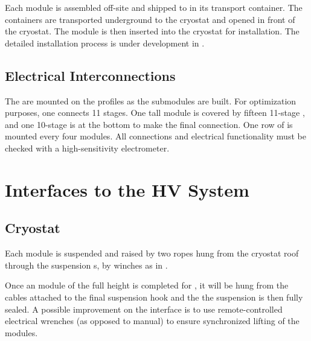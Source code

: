 Each  module is assembled off-site and shipped to \surf in its transport container.   The containers are transported underground to the cryostat and opened in front of the cryostat.  The  module is then inserted into the cryostat for installation. The detailed installation process is under development in .


\subsection{Electrical Interconnections}
\label{sec:fddp-prod-assy-elec-connec}

The  are mounted on the profiles as the submodules are built.  For optimization purposes, one   connects \num{11} stages.   %
One \tpcheight tall module is covered by fifteen \num{11}-stage , and one \num{10}-stage  is at the bottom to make the final connection.   One row of  is mounted every four  modules.  All connections and electrical functionality must be checked with a high-sensitivity electrometer.

\section{Interfaces to the HV System}
\label{sec:fddp-hv-intfc}

\subsection{Cryostat}
\label{sec:fddp-hv-intfc-to-cryostat}

Each  module is suspended and raised by two ropes hung from the cryostat roof through the  suspension \fdth{}s, by winches as in .  

Once an  module of the full height is completed for , it will be hung 
from the cables attached to the final suspension hook and the  
 the suspension \fdth is then fully sealed. 
A possible improvement on the  interface is to use remote-controlled electrical wrenches (as opposed to manual) to ensure synchronized lifting of the modules.

